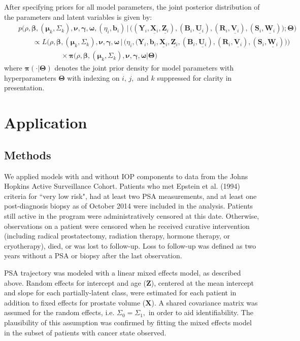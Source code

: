 \documentclass[12pt, letterpaper]{article}
\newcommand{\bmbeta}{\boldsymbol{\beta}}
\newcommand{\bmpi}{\boldsymbol{\pi}}
\newcommand{\bmnu}{\boldsymbol{\nu}}
\newcommand{\bmmu}{\boldsymbol{\mu}}
\newcommand{\bmgamma}{\boldsymbol{\gamma}}
\newcommand{\bmomega}{\boldsymbol{\omega}}
\newcommand{\bmY}{\mathbf{Y}}
\newcommand{\bmZ}{\mathbf{Z}}
\newcommand{\bmX}{\mathbf{X}}
\newcommand{\bmV}{\mathbf{V}}
\newcommand{\bmW}{\mathbf{W}}
\newcommand{\bmU}{\mathbf{U}}
\newcommand{\bmb}{\mathbf{b}}
\newcommand{\bmTheta}{\boldsymbol{\Theta}}
\newcommand{\bea}{\begin{eqnarray}}
\newcommand{\eea}{\end{eqnarray}}
\begin{document}
After specifying priors for all model parameters, the joint posterior distribution of the parameters and latent variables is given by:
\bea
&& p\Big(\rho, \bmbeta, (\bmmu_k,\Sigma_k), \bmnu, \bmgamma, \bmomega, (\eta_i,\bmb_i) \,| \, \big( (\bmY_i, \underline{\bmX_i}, \underline{\bmZ_i}), (\mathbf{B}_{i}, \underline{\bmU_{i}}), (\mathbf{R}_{i}, \underline{\bmV_{i}}), (\mathbf{S}_{i}, \underline{\bmW_{i}}) \big); \bmTheta\Big) \nonumber\\
&&\qquad  \propto L\Big(\rho,  \bmbeta, (\bmmu_k, \Sigma_k), \bmnu, \bmgamma, \bmomega \, | \,\big(\eta_i, (\bmY_i, \bmb_i, \underline{\bmX_i}, \underline{\bmZ_i},(\mathbf{B}_{i}, \underline{\bmU_{i}}), (\mathbf{R}_{i}, \underline{\bmV_{i}}), (\mathbf{S}_{i}, \underline{\bmW_{i}})\big) \Big)\nonumber\\
\label{eq:post-inf}
&& \qquad \qquad \qquad \times \bmpi\big(\rho,\bmbeta, (\bmmu_k, \Sigma_k), \bmnu, \bmgamma, \bmomega |\bmTheta\big)
\eea
where $\bmpi(\cdot|\bmTheta)$ denotes the joint prior density for model parameters with hyperparameters $\bmTheta$ with indexing on $i,\,j,$ and $k$ suppressed for clarity in presentation.


\section{Application}
\subsection{Methods}
We applied models with and without IOP components to data from the Johns Hopkins Active Surveillance Cohort. Patients who met Epstein et al. (1994) criteria for ``very low risk", had at least two PSA measurements, and at least one post-diagnosis biopsy as of October 2014 were included in the analysis. Patients still active in the program were administratively censored at this date. Otherwise, observations on a patient were censored when he received curative intervention (including radical prostatectomy, radiation therapy, hormone therapy, or cryotherapy), died, or was lost to follow-up. Loss to follow-up was defined as two years without a PSA  or biopsy after the last observation. 

PSA trajectory was modeled with a linear mixed effects model, as described above. Random effects for intercept and age ($\bmZ$), centered at the mean intercept and slope for each partially-latent class, were estimated for each patient in addition to fixed effects for prostate volume ($\bmX$). A shared covariance matrix was assumed for the random effects, i.e. $\Sigma_0=\Sigma_1,$ in order to aid identifiability. The plausibility of this assumption was confirmed by fitting the mixed effects model in the subset of patients with cancer state observed. 
\end{document}
